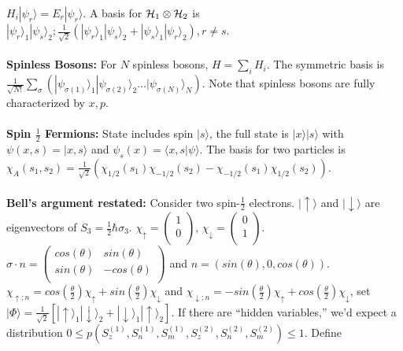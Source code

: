 $H_i | \psi_r \rangle = E_r | \psi_r \rangle$.  A basis for ${\cal H}_1 \otimes {\cal H}_2$ is
$ |\psi_r\rangle_1 |\psi_s\rangle_2; {\frac 1 {\sqrt 2}} ( |\psi_r\rangle_1 |\psi_s\rangle_2 + |\psi_s\rangle_1 |\psi_r\rangle_2), r \neq s $.
\\
\\
{\bf Spinless Bosons:}
For $N$ spinless bosons, $H= \sum_i H_i$.  The symmetric basis is
${\frac 1 {\sqrt {N!}}}  \sum_{\sigma} ( | \psi_{\sigma(1)} \rangle_1 | \psi_{\sigma(2)} \rangle_2 \ldots | \psi_{\sigma(N)} \rangle_N)$.  
Note that spinless bosons are fully characterized by $x, p$.
\\
\\
{\bf Spin ${\frac 1 2}$ Fermions:}
State includes spin $| s \rangle$, the full state is $|x\rangle | s \rangle$ with
$\psi(x,s)= | x, s \rangle$ and $\psi_s(x)= \langle x, s | \psi \rangle$.  The basis for two particles is
$\chi_A(s_1 , s_2)= {\frac 1 {\sqrt {2}}} ( \chi_{1/2}(s_1) \chi_{-1/2}(s_2) - \chi_{-1/2}(s_1) \chi_{1/2}(s_2))$. 
\\
\\
{\bf Bell's argument restated:}
Consider two spin-${\frac 1 2}$ electrons.
$|\uparrow\rangle$ and $|\downarrow\rangle$ are eigenvectors of $S_3= {\frac 1 2} \hbar \sigma_3$.
$\chi_{\uparrow}=
\left(
\begin{array}{c}
1\\
0\\
\end{array}
\right)$, 
$\chi_{\downarrow}=
\left(
\begin{array}{c}
0\\
1\\
\end{array}
\right)$.
$\sigma \cdot n=
\left(
\begin{array}{cc}
cos(\theta) & sin(\theta)\\
sin(\theta) & -cos(\theta)\\
\end{array}\right)$ and $n= ( sin(\theta), 0, cos(\theta))$.
$ \chi_{\uparrow;n}= cos({\frac {\theta} 2}) \chi_{\uparrow}+
sin({\frac {\theta} 2}) \chi_{\downarrow} $ and
$ \chi_{\downarrow;n}= -sin({\frac {\theta} 2}) \chi_{\uparrow}+
cos({\frac {\theta} 2}) \chi_{\downarrow}$, 
set $| \Phi \rangle= {\frac 1 {\sqrt 2}} [ 
| \uparrow \rangle_1 | \downarrow \rangle_2 + | \downarrow \rangle_1 | \uparrow \rangle_2 ]$.  If there are
``hidden variables,'' we'd expect a distribution $0 \leq
p(S_z^{(1)}, S_n^{(1)}, S_m^{(1)}, S_z^{(2)}, S_n^{(2)}, S_m^{(2)}) \leq 1$.  Define
